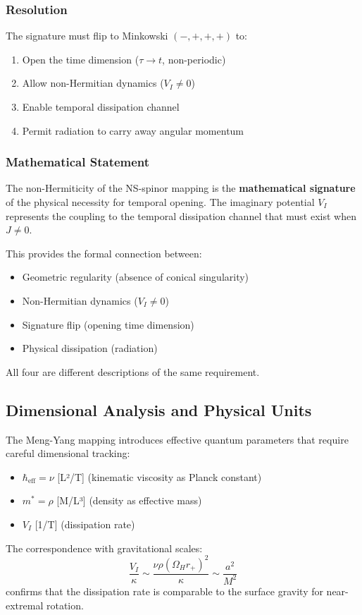 \documentclass[11pt]{article}
\begin{document}
\subsubsection{Resolution}

The signature must flip to Minkowski $(-,+,+,+)$ to:
\begin{enumerate}
\item Open the time dimension ($\tau \to t$, non-periodic)
\item Allow non-Hermitian dynamics ($V_I \neq 0$)
\item Enable temporal dissipation channel
\item Permit radiation to carry away angular momentum
\end{enumerate}

\subsubsection{Mathematical Statement}

The non-Hermiticity of the NS-spinor mapping is the \textbf{mathematical signature} of the physical necessity for temporal opening. The imaginary potential $V_I$ represents the coupling to the temporal dissipation channel that must exist when $J \neq 0$.

This provides the formal connection between:
\begin{itemize}
\item Geometric regularity (absence of conical singularity)
\item Non-Hermitian dynamics ($V_I \neq 0$)
\item Signature flip (opening time dimension)
\item Physical dissipation (radiation)
\end{itemize}

All four are different descriptions of the same requirement.

\subsection{Dimensional Analysis and Physical Units}

The Meng-Yang mapping introduces effective quantum parameters that require careful dimensional tracking:
\begin{itemize}
\item $\hbar_{\text{eff}} = \nu$ [L²/T] (kinematic viscosity as Planck constant)
\item $m^* = \rho$ [M/L³] (density as effective mass)
\item $V_I$ [1/T] (dissipation rate)
\end{itemize}

The correspondence with gravitational scales:
\begin{equation}
\frac{V_I}{\kappa} \sim \frac{\nu\rho(\Omega_H r_+)^2}{\kappa} \sim \frac{a^2}{M^2}
\end{equation}
confirms that the dissipation rate is comparable to the surface gravity for near-extremal rotation.
\end{document}
